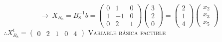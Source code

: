 \begin{itemize}
    $$\rightarrow \:X_{B_8}=B_8^{-1}b=\begin{pmatrix}0&1&0\\ 1&-1&0\\ 0&2&1\end{pmatrix}\begin{pmatrix}3\\ 2\\ 0\end{pmatrix}=\begin{pmatrix}2\\ 1\\ 4\end{pmatrix}\begin{pmatrix}x_2\\ x_3\\ x_5\end{pmatrix}$$
    $\therefore X_{B_8}^t=\begin{pmatrix}0&2&1&0&4\end{pmatrix}$ \textsc{Variable  básica factible}
    

\end{itemize}
